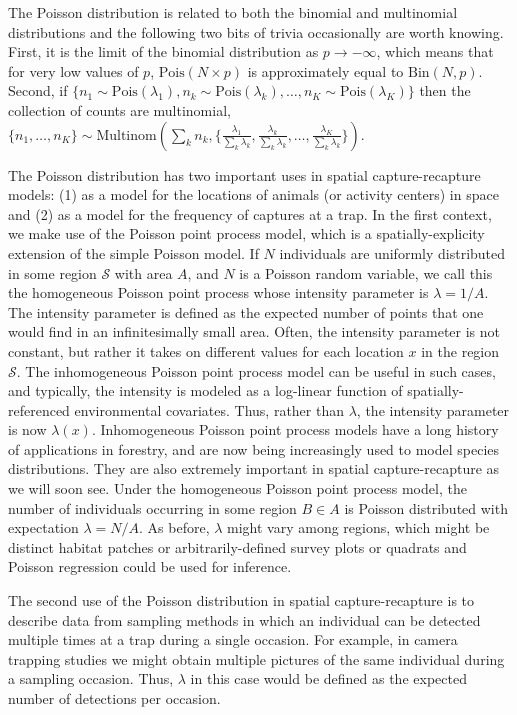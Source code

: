 The Poisson distribution is related to
both the binomial and multinomial distributions and the following two
bits of trivia occasionally are worth knowing. First, it is the limit of the binomial
distribution as $p \to -\infty$, which means that for very low values
of $p$, $\text{Pois}(N\times p)$ is approximately equal to $\text{Bin}(N,
p)$. Second, if $\{n_1 \sim \text{Pois}(\lambda_1),
n_k \sim \text{Pois}(\lambda_k),
\dots, n_K \sim \text{Pois}(\lambda_K)\}$
then the collection of counts are multinomial, $\{n_1, \dots, n_K\}
\sim \text{Multinom}(\sum_k n_k, \{\frac{\lambda_1}{\sum_k \lambda_k},
\frac{\lambda_k}{\sum_k \lambda_k},
\dots, \frac{\lambda_K}{\sum_k \lambda_k}
\})$.

The Poisson distribution has two important uses in spatial
capture-recapture models: (1) as a model for the locations of animals
(or activity centers) in space and (2) as a model for the frequency of
captures at a trap. In the first context, we
make use of the Poisson point process model, which is a
spatially-explicity extension of the simple Poisson model.
If $N$ individuals are uniformly distributed in some region
$\mathcal{S}$ with area $A$, and $N$ is a Poisson
random variable, we call this the homogeneous Poisson point process
whose intensity parameter is $\lambda = 1/A$. The intensity parameter
is defined as the expected number of points that one would find in an
infinitesimally small area. Often, the intensity parameter is not
constant, but rather it takes on different values for each location
$x$ in the region $\mathcal{S}$. The inhomogeneous Poisson point
process model can be useful in such cases, and typically, the
intensity is modeled as a log-linear function of spatially-referenced
environmental covariates. Thus, rather than $\lambda$, the intensity
parameter is now $\lambda(x)$. Inhomogeneous Poisson point process
models have a long history of applications in forestry, and are now
being increasingly used to model species distributions. They are also
extremely important in spatial capture-recapture as we will soon see.
Under the homogeneous Poisson point process model,
the number of individuals occurring in some
region $B \in A$ is Poisson distributed with expectation
$\lambda = N/A$. As before, $\lambda$ might vary among regions, which
might be distinct habitat patches or arbitrarily-defined survey plots or
quadrats and Poisson regression could be used for inference.

The second use of the Poisson distribution in spatial
capture-recapture is
to describe data from sampling methods in which an
individual can be detected multiple times at a trap during a single
occasion. For example, in camera trapping studies we might obtain
multiple pictures of the same individual during a sampling
occasion. Thus, $\lambda$ in this case would be defined as the
expected number of detections per occasion.


